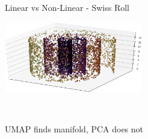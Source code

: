 \documentclass[t, 11pt, xcolor=dvipsnames]{beamer}
\begin{document}
\begin{frame}[fragile]{Linear vs Non-Linear - Swiss Roll}
\begin{center}
{\begin{minipage}[t][0.40\textheight][t]{0.45\textwidth}
\begin{center}
{                    \includegraphics[width=0.45\textwidth]{images/pcavsmani/swiss_UMAP_1_crop.png}}
                    \end{center}
		  \end{minipage}}
                  ~
		  \begin{minipage}[t][0.3\textheight][t]{0.45\textwidth}
                    UMAP finds manifold, PCA does not
		  \end{minipage}
	\end{center}
\end{frame}
\end{document}
